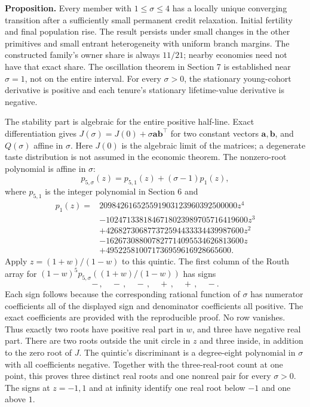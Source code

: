 \documentclass[
  11pt,
]{article}
\begin{document}
\textbf{Proposition.} Every member with \(1\leq\sigma\leq4\) has a
locally unique converging transition after a sufficiently small
permanent credit relaxation. Initial fertility and final population
rise. The result persists under small changes in the other primitives
and small entrant heterogeneity with uniform branch margins. The
constructed family's owner share is always \(11/21\); nearby economies
need not have that exact share. The oscillation theorem in Section 7 is
established near \(\sigma=1\), not on the entire interval. For every
\(\sigma>0\), the stationary young-cohort derivative is positive and
each tenure's stationary lifetime-value derivative is negative.

The stability part is algebraic for the entire positive half-line. Exact
differentiation gives \(J(\sigma)=J(0)+\sigma \mathbf a\mathbf b^\top\)
for two constant vectors \(\mathbf a,\mathbf b\), and \(Q(\sigma)\)
affine in \(\sigma\). Here \(J(0)\) is the algebraic limit of the
matrices; a degenerate taste distribution is not assumed in the economic
theorem. The nonzero-root polynomial is affine in \(\sigma\): \[
 p_{5,\sigma}(z)=p_{5,1}(z)+(\sigma-1)p_1(z),
\] where \(p_{5,1}\) is the integer polynomial in Section 6 and \[
\begin{split}
 p_1(z)={}&209842616525591903123960392500000z^4\\
 &-1024713381846718023989705716419600z^3\\
 &+426827306877372594433334439987600z^2\\
 &-162673088007827714095534626813600z\\
 &+495225810071736959616928665600.
\end{split}
\] Apply \(z=(1+w)/(1-w)\) to this quintic. The first column of the
Routh array for \((1-w)^5p_{5,\sigma}((1+w)/(1-w))\) has signs \[
 -\,,\quad-\,,\quad-\,,\quad+\,,\quad+\,,\quad-.
\] Each sign follows because the corresponding rational function of
\(\sigma\) has numerator coefficients all of the displayed sign and
denominator coefficients all positive. The exact coefficients are
provided with the reproducible proof. No row vanishes. Thus exactly two
roots have positive real part in \(w\), and three have negative real
part. There are two roots outside the unit circle in \(z\) and three
inside, in addition to the zero root of \(J\). The quintic's
discriminant is a degree-eight polynomial in \(\sigma\) with all
coefficients negative. Together with the three-real-root count at one
point, this proves three distinct real roots and one nonreal pair for
every \(\sigma>0\). The signs at \(z=-1,1\) and at infinity identify one
real root below \(-1\) and one above \(1\).
\end{document}
